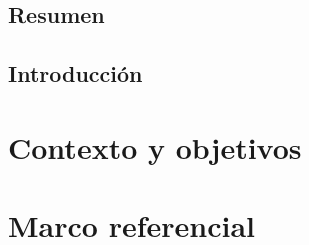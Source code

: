 \documentclass[spanish, a4paper, 12pt, twoside, openany]{book}
\numberwithin{equation}{section} %
\begin{document}
\section*{Resumen}


\newpage
{}
\thispagestyle{empty} %
\section*{Introducción}


\newpage
{} %

\chapter{Contexto y objetivos}















\chapter{Marco referencial}
\end{document}
